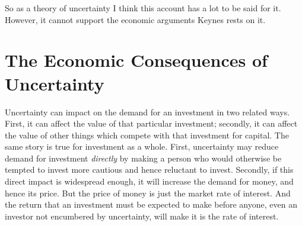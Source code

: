 \documentclass[
  11pt,
  letterpaper,
  DIV=11,
  numbers=noendperiod,
  twoside]{scrartcl}
\begin{document}
So as a theory of uncertainty I think this account has a lot to be said
for it. However, it cannot support the economic arguments Keynes rests
on it.

\section{The Economic Consequences of
Uncertainty}\label{the-economic-consequences-of-uncertainty}

Uncertainty can impact on the demand for an investment in two related
ways. First, it can affect the value of that particular investment;
secondly, it can affect the value of other things which compete with
that investment for capital. The same story is true for investment as a
whole. First, uncertainty may reduce demand for investment
\emph{directly} by making a person who would otherwise be tempted to
invest more cautious and hence reluctant to invest. Secondly, if this
direct impact is widespread enough, it will increase the demand for
money, and hence its price. But the price of money is just the market
rate of interest. And the return that an investment must be expected to
make before anyone, even an investor not encumbered by uncertainty, will
make it is the rate of interest.
\end{document}
